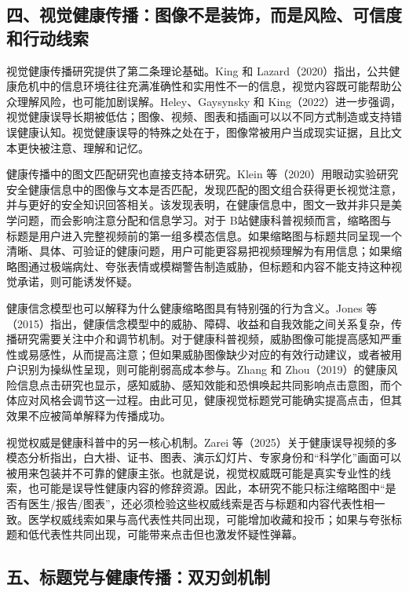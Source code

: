 \documentclass[
  12pt,
]{article}
\begin{document}
\subsection{四、视觉健康传播：图像不是装饰，而是风险、可信度和行动线索}\label{ux56dbux89c6ux89c9ux5065ux5eb7ux4f20ux64adux56feux50cfux4e0dux662fux88c5ux9970ux800cux662fux98ceux9669ux53efux4fe1ux5ea6ux548cux884cux52a8ux7ebfux7d22}

视觉健康传播研究提供了第二条理论基础。King 和
Lazard（2020）指出，公共健康危机中的信息环境往往充满准确性和实用性不一的信息，视觉内容既可能帮助公众理解风险，也可能加剧误解。Heley、Gaysynsky
和
King（2022）进一步强调，视觉健康误导长期被低估；图像、视频、图表和插画可以以不同方式制造或支持错误健康认知。视觉健康误导的特殊之处在于，图像常被用户当成现实证据，且比文本更快被注意、理解和记忆。

健康传播中的图文匹配研究也直接支持本研究。Klein
等（2020）用眼动实验研究安全健康信息中的图像与文本是否匹配，发现匹配的图文组合获得更长视觉注意，并与更好的安全知识回答相关。该发现表明，在健康信息中，图文一致并非只是美学问题，而会影响注意分配和信息学习。对于
B站健康科普视频而言，缩略图与标题是用户进入完整视频前的第一组多模态信息。如果缩略图与标题共同呈现一个清晰、具体、可验证的健康问题，用户可能更容易把视频理解为有用信息；如果缩略图通过极端病灶、夸张表情或模糊警告制造威胁，但标题和内容不能支持这种视觉承诺，则可能诱发怀疑。

健康信念模型也可以解释为什么健康缩略图具有特别强的行为含义。Jones
等（2015）指出，健康信念模型中的威胁、障碍、收益和自我效能之间关系复杂，传播研究需要关注中介和调节机制。对于健康科普视频，威胁图像可能提高感知严重性或易感性，从而提高注意；但如果威胁图像缺少对应的有效行动建议，或者被用户识别为操纵性呈现，则可能削弱高成本参与。Zhang
和
Zhou（2019）的健康风险信息点击研究也显示，感知威胁、感知效能和恐惧唤起共同影响点击意图，而个体应对风格会调节这一过程。由此可见，健康视觉标题党可能确实提高点击，但其效果不应被简单解释为传播成功。

视觉权威是健康科普中的另一核心机制。Zarei
等（2025）关于健康误导视频的多模态分析指出，白大褂、证书、图表、演示幻灯片、专家身份和``科学化''画面可以被用来包装并不可靠的健康主张。也就是说，视觉权威既可能是真实专业性的线索，也可能是误导性健康内容的修辞资源。因此，本研究不能只标注缩略图中``是否有医生/报告/图表''，还必须检验这些权威线索是否与标题和内容代表性相一致。医学权威线索如果与高代表性共同出现，可能增加收藏和投币；如果与夸张标题和低代表性共同出现，可能带来点击但也激发怀疑性弹幕。

\subsection{五、标题党与健康传播：双刃剑机制}\label{ux4e94ux6807ux9898ux515aux4e0eux5065ux5eb7ux4f20ux64adux53ccux5203ux5251ux673aux5236}
\end{document}
